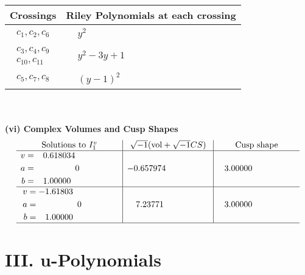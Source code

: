 \documentclass[1p]{elsarticle_modified}
\theoremstyle{definition}
\newcommand{\I}{\sqrt{-1}}
\begin{document}
\begin{tabular}{m{50pt}|m{274pt}}
Crossings & \hspace{64pt}Riley Polynomials at each crossing \\
\hline $$\begin{aligned}c_{1},c_{2},c_{6}\end{aligned}$$&$\begin{aligned}
&y^2
\end{aligned}$\\
\hline $$\begin{aligned}c_{3},c_{4},c_{9}\\c_{10},c_{11}\end{aligned}$$&$\begin{aligned}
&y^2-3 y+1
\end{aligned}$\\
\hline $$\begin{aligned}c_{5},c_{7},c_{8}\end{aligned}$$&$\begin{aligned}
&(y-1)^2
\end{aligned}$\\
\hline
\end{tabular}\\~\\
\newpage\flushleft \textbf{(vi) Complex Volumes and Cusp Shapes}
$$\begin{array}{c|c|c}  
\text{Solutions to }I^v_{1}& \I (\text{vol} + \sqrt{-1}CS) & \text{Cusp shape}\\
 \hline 
\begin{aligned}
v &= \phantom{-}0.618034\phantom{ +0.000000I} \\
a &= \phantom{-0.000000 } 0 \\
b &= \phantom{-}1.00000\phantom{ +0.000000I}\end{aligned}
 & -0.657974\phantom{ +0.000000I} & \phantom{-}3.00000\phantom{ +0.000000I} \\ \hline\begin{aligned}
v &= -1.61803\phantom{ +0.000000I} \\
a &= \phantom{-0.000000 } 0 \\
b &= \phantom{-}1.00000\phantom{ +0.000000I}\end{aligned}
 & \phantom{-}7.23771\phantom{ +0.000000I} & \phantom{-}3.00000\phantom{ +0.000000I}\\
 \hline 
 \end{array}$$\newpage
\newpage\renewcommand{\arraystretch}{1}
\centering \section*{ III. u-Polynomials}
\end{document}
